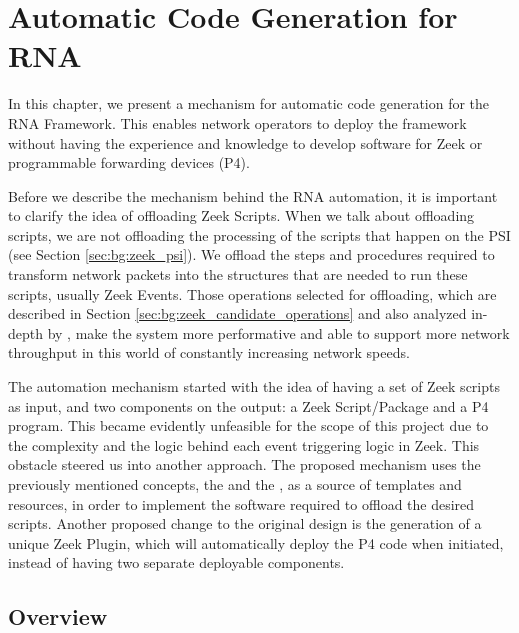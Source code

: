 \chapter{Automatic Code Generation for RNA}
\label{cap:code_gen}



In this chapter, we present a mechanism for automatic code generation for the RNA Framework. This enables network operators to deploy the framework without having the experience and knowledge to develop software for Zeek or programmable forwarding devices (P4).

Before we describe the mechanism behind the RNA automation, it is important to clarify the idea of offloading Zeek Scripts. When we talk about offloading scripts, we are not offloading the processing of the scripts that happen on the PSI (see Section \ref{sec:bg:zeek_psi}). We offload the steps and procedures required to transform network packets into the structures that are needed to run these scripts, usually Zeek Events. Those operations selected for offloading, which are described in Section \ref{sec:bg:zeek_candidate_operations} and also analyzed in-depth by , make the system more performative and able to support more network throughput in this world of constantly increasing network speeds.



The automation mechanism started with the idea of having a set of Zeek scripts as input, and two components on the output: a Zeek Script/Package and a P4 program. This became evidently unfeasible for the scope of this project due to the complexity and the logic behind each event triggering logic in Zeek. This obstacle steered us into another approach. The proposed mechanism uses the previously mentioned concepts, the \ProtocolTemplates{} and the \Offloaders{}, as a source of templates and resources, in order to implement the software required to offload the desired scripts. Another proposed change to the original design is the generation of a unique Zeek Plugin, which will automatically deploy the P4 code when initiated, instead of having two separate deployable components.

\section{Overview}
\label{sec:code_gen:overview}


